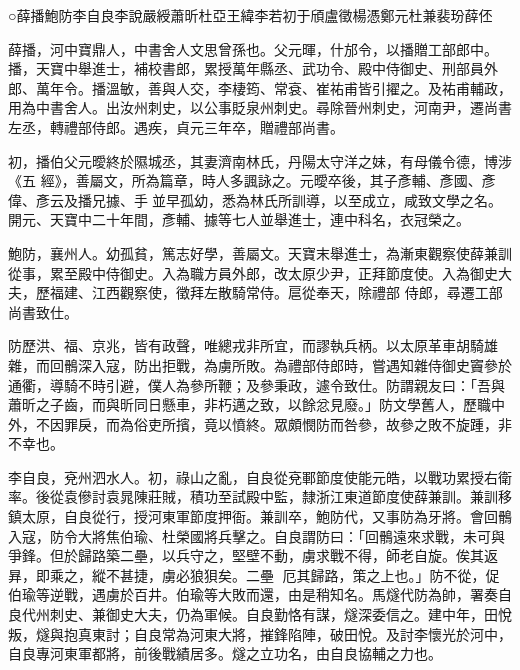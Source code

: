 
\begin{pinyinscope}

 ○薛播鮑防李自良李說嚴綬蕭昕杜亞王緯李若初于頎盧徵楊憑鄭元杜兼裴玢薛伾



 薛播，河中寶鼎人，中書舍人文思曾孫也。父元暉，什邡令，以播贈工部郎中。播，天寶中舉進士，補校書郎，累授萬年縣丞、武功令、殿中侍御史、刑部員外郎、萬年令。播溫敏，善與人交，李棲筠、常袞、崔祐甫皆引擢之。及祐甫輔政，用為中書舍人。出汝州刺史，以公事貶泉州刺史。尋除晉州刺史，河南尹，遷尚書左丞，轉禮部侍郎。遇疾，貞元三年卒，贈禮部尚書。



 初，播伯父元曖終於隰城丞，其妻濟南林氏，丹陽太守洋之妹，有母儀令德，博涉《五
 經》，善屬文，所為篇章，時人多諷詠之。元曖卒後，其子彥輔、彥國、彥偉、彥云及播兄據、手並早孤幼，悉為林氏所訓導，以至成立，咸致文學之名。開元、天寶中二十年間，彥輔、據等七人並舉進士，連中科名，衣冠榮之。



 鮑防，襄州人。幼孤貧，篤志好學，善屬文。天寶末舉進士，為漸東觀察使薛兼訓從事，累至殿中侍御史。入為職方員外郎，改太原少尹，正拜節度使。入為御史大夫，歷福建、江西觀察使，徵拜左散騎常侍。扈從奉天，除禮部
 侍郎，尋遷工部尚書致仕。



 防歷洪、福、京兆，皆有政聲，唯總戎非所宜，而謬執兵柄。以太原革車胡騎雄雜，而回鶻深入寇，防出拒戰，為虜所敗。為禮部侍郎時，嘗遇知雜侍御史竇參於通衢，導騎不時引避，僕人為參所鞭；及參秉政，遽令致仕。防謂親友曰：「吾與蕭昕之子齒，而與昕同日懸車，非朽邁之致，以餘忿見廢。」防文學舊人，歷職中外，不因罪戾，而為俗吏所擯，竟以憤終。眾頗憫防而咎參，故參之敗不旋踵，非不幸也。



 李自良，兗州泗水人。初，祿山之亂，自良從兗鄆節度使能元皓，以戰功累授右衛率。後從袁傪討袁晁陳莊賊，積功至試殿中監，隸浙江東道節度使薛兼訓。兼訓移鎮太原，自良從行，授河東軍節度押衙。兼訓卒，鮑防代，又事防為牙將。會回鶻入寇，防令大將焦伯瑜、杜榮國將兵擊之。自良謂防曰：「回鶻遠來求戰，未可與爭鋒。但於歸路築二壘，以兵守之，堅壁不動，虜求戰不得，師老自旋。俟其返昪，即乘之，縱不甚捷，虜必狼狽矣。二壘
 厄其歸路，策之上也。」防不從，促伯瑜等逆戰，遇虜於百井。伯瑜等大敗而還，由是稍知名。馬燧代防為帥，署奏自良代州刺史、兼御史大夫，仍為軍候。自良勤恪有謀，燧深委信之。建中年，田悅叛，燧與抱真東討；自良常為河東大將，摧鋒陷陣，破田悅。及討李懷光於河中，自良專河東軍都將，前後戰績居多。燧之立功名，由自良協輔之力也。




\end{pinyinscope}

